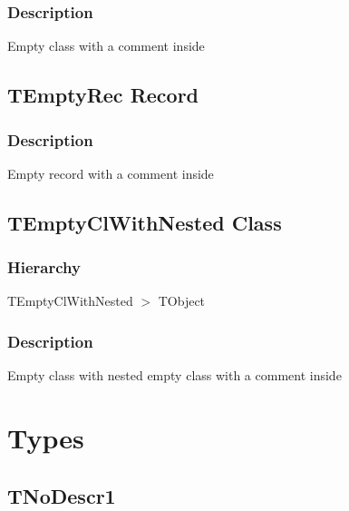 \documentclass{report}
\newif\ifpdf
\begin{document}
\subsubsection*{\large{\textbf{Description}}\normalsize\hspace{1ex}\hfill}
Empty class with a comment inside\ifpdf
\subsection*{\large{\textbf{TEmptyRec Record}}\normalsize\hspace{1ex}\hrulefill}
\else
\subsection*{TEmptyRec Record}
\fi
\label{ok_no_comments_outside_class.TEmptyRec}
\subsubsection*{\large{\textbf{Description}}\normalsize\hspace{1ex}\hfill}
Empty record with a comment inside\ifpdf
\subsection*{\large{\textbf{TEmptyClWithNested Class}}\normalsize\hspace{1ex}\hrulefill}
\else
\subsection*{TEmptyClWithNested Class}
\fi
\label{ok_no_comments_outside_class.TEmptyClWithNested}
\subsubsection*{\large{\textbf{Hierarchy}}\normalsize\hspace{1ex}\hfill}
TEmptyClWithNested {$>$} TObject
\subsubsection*{\large{\textbf{Description}}\normalsize\hspace{1ex}\hfill}
Empty class with nested empty class with a comment inside\section{Types}
\ifpdf
\subsection*{\large{\textbf{TNoDescr1}}\normalsize\hspace{1ex}\hrulefill}
\else
\end{document}
